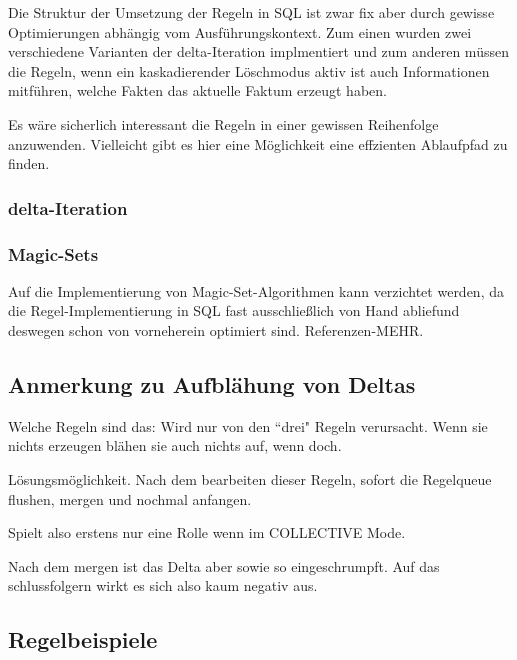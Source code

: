 Die Struktur der Umsetzung der Regeln in SQL ist zwar fix aber durch gewisse Optimierungen abhängig vom Ausführungskontext. Zum einen wurden zwei verschiedene Varianten der delta-Iteration implmentiert und zum anderen müssen die Regeln, wenn ein kaskadierender Löschmodus aktiv ist auch Informationen mitführen, welche Fakten das aktuelle Faktum erzeugt haben.

Es wäre sicherlich interessant die Regeln in einer gewissen Reihenfolge anzuwenden. Vielleicht gibt es hier eine Möglichkeit eine effzienten Ablaufpfad zu finden.

\subsubsection{delta-Iteration}


\subsubsection{Magic-Sets}
Auf die Implementierung von Magic-Set-Algorithmen kann verzichtet werden, da die Regel-Implementierung in SQL fast ausschließlich von Hand abliefund deswegen schon von vorneherein optimiert sind.
Referenzen-MEHR.

\subsection{Anmerkung zu Aufblähung von Deltas}
Welche Regeln sind das:
Wird nur von den ``drei" Regeln verursacht. Wenn sie nichts erzeugen blähen sie auch nichts auf, wenn doch.

Lösungsmöglichkeit. Nach dem bearbeiten dieser Regeln, sofort die Regelqueue flushen, mergen und nochmal anfangen.

Spielt also erstens nur eine Rolle wenn im COLLECTIVE Mode.

Nach dem mergen ist das Delta aber sowie so eingeschrumpft. Auf das schlussfolgern wirkt es sich also kaum negativ aus.

\subsection{Regelbeispiele}

